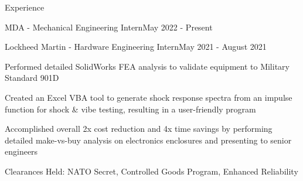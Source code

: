 \documentclass{resume} %
\begin{document}
\begin{rSection}{Experience}
\begin{rSubsection}{MDA - Mechanical Engineering Intern}{May 2022 - Present}{}{}
\end{rSubsection}


\begin{rSubsection}{Lockheed Martin - Hardware Engineering Intern}{May 2021 - August 2021}{}{}

\item Performed detailed SolidWorks FEA analysis to validate equipment to Military Standard 901D
\item Created an Excel VBA tool to generate shock response spectra from an impulse function for shock \& vibe testing, resulting in a user-friendly program
\item Accomplished overall 2x cost reduction and 4x time savings by performing detailed make-vs-buy analysis on electronics enclosures and presenting to senior engineers
\item Clearances Held: NATO Secret, Controlled Goods Program, Enhanced Reliability

\end{rSubsection}

\begin{comment}
\begin{rSubsection}{Department of National Defense - Engineering Intern}{May 2020 - September 2020}{}{}

\item Documented and presented key specifications on armored patrol vehicles for 411 vehicles in 69 variants
\item Reworked procurement documents based on technical requirements from multiple military bases
\item Proofread english-to-french translations of contracts to ensure correctness

\end{rSubsection}

\end{rSection}

\begin{rSection}{Projects \& Publications}

\begin{rSubsection}{Undergraduate Publication}{September 2021 - December 2021}{An Investigation of Magnetic Radiation Shields for Human Space Habitats}{Awad et al.}
\item Designed and conducted an experiment over 6 weeks to measure the viability of a superconducting magnet as an active shield from radiation, GCRs, and lunar regolith for lightweight space travel applications
\item Manufactured a vacuum chamber with a cooling tube configuration, wire feed-through, and a beta particle detector capable of maintaining a vacuum of 0.1 Pa to minimize particle stopping power and reduce condensation
\item Designed superconducting magnet configurations made of superconducting YBCO tape with a vacuum-tight cooling system to maintain critical temperatures of 77K
\item Created a Python program to perform in-depth analysis of the raw data, including noise filtering, curve fitting, and extrapolation to demonstrate clear trends


\end{comment}
\end{rSection}
\end{document}
